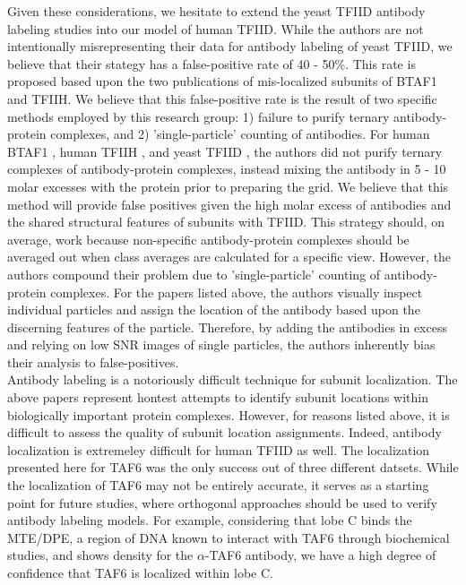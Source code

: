 \indent Given these considerations, we hesitate to extend the yeast TFIID antibody labeling studies into our model of human TFIID. While the authors are not intentionally misrepresenting their data for antibody labeling of yeast TFIID, we believe that their stategy has a false-positive rate of 40 - 50\%. This rate is proposed based upon the two publications of mis-localized subunits of BTAF1 and TFIIH. We believe that this false-positive rate is the result of two specific methods employed by this research group: 1) failure to purify ternary antibody-protein complexes, and 2) 'single-particle' counting of antibodies. For human BTAF1 \cite{Pereira_2004}, human TFIIH \cite{Schultz_2000}, and yeast TFIID \cite{Leurent_1554,Leurent_1797}, the authors did not purify ternary complexes of antibody-protein complexes, instead mixing the antibody in 5 - 10 molar excesses with the protein prior to preparing the grid. We believe that this method will provide false positives given the high molar excess of antibodies and the shared structural features of subunits with TFIID. This strategy should, on average, work because non-specific antibody-protein complexes should be averaged out when class averages are calculated for a specific view. However, the authors compound their problem due to 'single-particle' counting of antibody-protein complexes. For the papers listed above, the authors visually inspect individual particles and assign the location of the antibody based upon the discerning features of the particle. Therefore, by adding the antibodies in excess and relying on low SNR images of single particles, the authors inherently bias their analysis to false-positives. \\
\indent Antibody labeling is a notoriously difficult technique for subunit localization. The above papers represent hontest attempts to identify subunit locations within biologically important protein complexes. However, for reasons listed above, it is difficult to assess the quality of subunit location assignments. Indeed, antibody localization is extremeley difficult for human TFIID as well. The localization presented here for TAF6 was the only success out of three different datsets. While the localization of TAF6 may not be entirely accurate, it serves as a starting point for future studies, where orthogonal approaches should be used to verify antibody labeling models. For example, considering that lobe C binds the MTE/DPE, a region of DNA known to interact with TAF6 through biochemical studies, and shows density for the $\alpha$-TAF6 antibody, we have a high degree of confidence that TAF6 is localized within lobe C. \\


